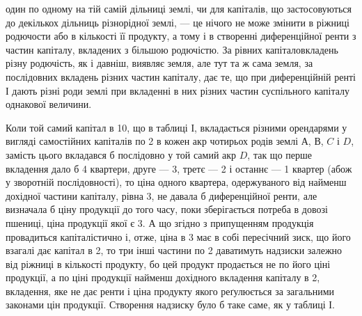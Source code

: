 \parcont{}  %
один по одному на тій самій дільниці землі, чи для капіталів, що застосовуються
до декількох дільниць різнорідної землі, — це нічого не може змінити в ріжниці
родючости або в кількості її продукту, а тому і в створенні диференційної
ренти з частин капіталу, вкладених з більшою родючістю. За рівних капіталовкладень
різну родючість, як і давніш, виявляє земля, але тут та ж сама земля,
за послідовних вкладень різних частин капіталу, дає те, що при диференційній
ренті І дають різні роди землі при вкладенні в них різних частин суспільного
капіталу однакової величини.

Коли той самий капітал в 10, що в таблиці І, вкладається різними орендарями
у вигляді самостійних капіталів по 2 в кожен акр чотирьох родів
землі $А$, $В$, $C$ і $D$, замість цього вкладався б послідовно у той самий акр
$D$, так що перше вкладення дало б 4 квартери, друге — 3, третє — 2 і останнє
— 1 квартер (абож у зворотній послідовності), то ціна одного квартера, одержуваного
від найменш дохідної частини капіталу, рівна 3, не давала б диференційної
ренти, але визначала б ціну продукції до того часу, поки зберігається
потреба в довозі пшениці, ціна продукції якої є 3. А що згідно з припущенням
продукція провадиться капіталістично і, отже, ціна в 3 має
в собі пересічний зиск, що його взагалі дає капітал в 2, то три інші
частини по 2 даватимуть надзиски залежно від ріжниці в кількості
продукту, бо цей продукт продається не по його ціні продукції, а по ціні продукції
найменш дохідного вкладення капіталу в 2, вкладення, яке не дає ренти
і ціна продукту якого реґулюється за загальними законами цін продукції. Створення
надзиску було б таке саме, як у таблиці І.

